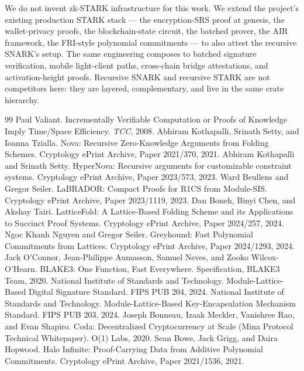 \documentclass[11pt,a4paper]{article}
\begin{document}
We do not invent zk-STARK infrastructure for this work. We extend the
project's existing production STARK stack --- the encryption-SRS
proof at genesis, the wallet-privacy proofs, the blockchain-state
circuit, the batched prover, the AIR framework, the FRI-style
polynomial commitments --- to also attest the recursive SNARK's
setup. The same engineering composes to batched signature verification,
mobile light-client paths, cross-chain bridge attestations, and
activation-height proofs. Recursive SNARK and recursive STARK are
not competitors here: they are layered, complementary, and live in
the same crate hierarchy.

\begin{thebibliography}{99}
 Paul Valiant. Incrementally Verifiable Computation or Proofs of Knowledge Imply Time/Space Efficiency. \emph{TCC}, 2008.
 Abhiram Kothapalli, Srinath Setty, and Ioanna Tzialla. Nova: Recursive Zero-Knowledge Arguments from Folding Schemes. Cryptology ePrint Archive, Paper 2021/370, 2021.
 Abhiram Kothapalli and Srinath Setty. HyperNova: Recursive arguments for customizable constraint systems. Cryptology ePrint Archive, Paper 2023/573, 2023.
 Ward Beullens and Gregor Seiler. LaBRADOR: Compact Proofs for R1CS from Module-SIS. Cryptology ePrint Archive, Paper 2023/1119, 2023.
 Dan Boneh, Binyi Chen, and Akshay Tairi. LatticeFold: A Lattice-Based Folding Scheme and its Applications to Succinct Proof Systems. Cryptology ePrint Archive, Paper 2024/257, 2024.
 Ngoc Khanh Nguyen and Gregor Seiler. Greyhound: Fast Polynomial Commitments from Lattices. Cryptology ePrint Archive, Paper 2024/1293, 2024.
 Jack O'Connor, Jean-Philippe Aumasson, Samuel Neves, and Zooko Wilcox-O'Hearn. BLAKE3: One Function, Fast Everywhere. Specification, BLAKE3 Team, 2020.
 National Institute of Standards and Technology. Module-Lattice-Based Digital Signature Standard. FIPS PUB 204, 2024.
 National Institute of Standards and Technology. Module-Lattice-Based Key-Encapsulation Mechanism Standard. FIPS PUB 203, 2024.
 Joseph Bonneau, Izaak Meckler, Vanishree Rao, and Evan Shapiro. Coda: Decentralized Cryptocurrency at Scale (Mina Protocol Technical Whitepaper). O(1) Labs, 2020.
 Sean Bowe, Jack Grigg, and Daira Hopwood. Halo Infinite: Proof-Carrying Data from Additive Polynomial Commitments. Cryptology ePrint Archive, Paper 2021/1536, 2021.

\end{thebibliography}
\end{document}
